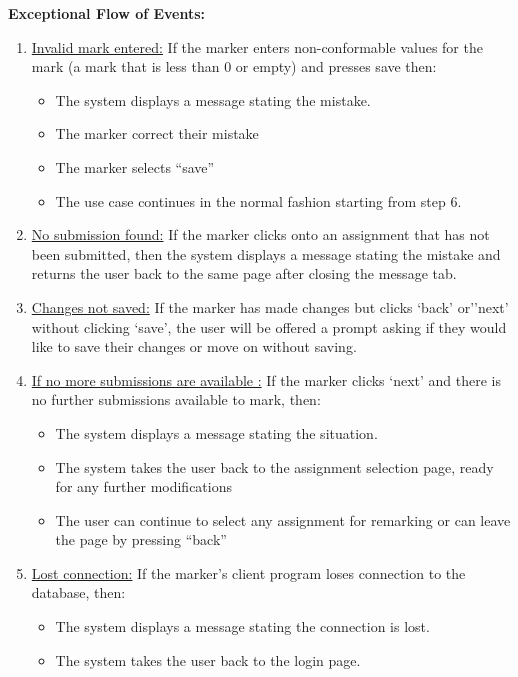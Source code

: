 \documentclass{article}
\begin{document}
\textbf{Exceptional Flow of Events:}
\begin{enumerate}

\item \underline {Invalid mark entered:} If the marker enters non-conformable values for the mark (a mark that is less than 0 or empty) and presses save then:
	\begin {itemize}
		\item The system displays a message stating the mistake.
		\item The marker correct their mistake
		\item The marker selects “save”
		\item The use case continues in the normal fashion starting from step 6.
	\end {itemize}
\item \underline {No submission found:}
If the marker clicks onto an assignment that has not been submitted, then the system displays a message stating the mistake and returns the user back to the same page after closing the message tab.

\item \underline {Changes not saved:} If the marker has made changes but clicks ‘back’ or’’next’ without clicking ‘save’, the user will be offered a prompt asking if they would like to save their changes or move on without saving.
\item \underline {If no more submissions are available :} If the marker clicks ‘next’ and there is no further submissions available to mark, then:
\begin {itemize}
	\item The system displays a message stating the situation.
	\item The system takes the user back to the assignment selection page, ready for any further modifications
	\item The user can continue to select any assignment for remarking or can leave the page by pressing “back”
\end {itemize}

\item \underline {Lost connection:} If the marker’s client program loses connection to the database, then: 
\begin {itemize}
\item The system displays a message stating the connection is lost. 
\item The system takes the user back to the login page.
\end {itemize}
\end {enumerate}
\end{document}
